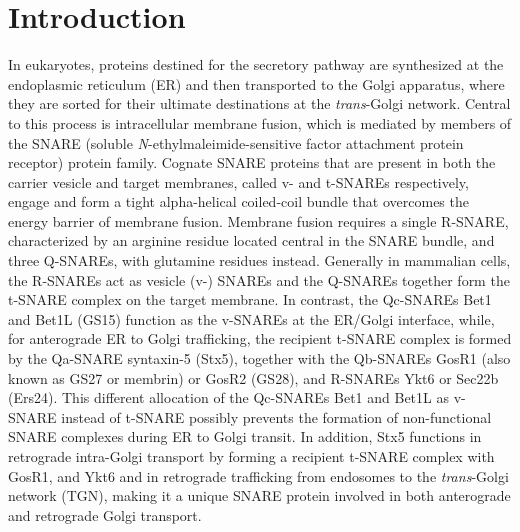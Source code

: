 \section{Introduction}

In eukaryotes, proteins destined for the secretory pathway are synthesized at the endoplasmic reticulum (ER) and then transported to the Golgi apparatus, where they are sorted for their ultimate destinations at the \emph{trans}-Golgi network. Central to this process is intracellular membrane fusion, which is mediated by members of the SNARE (soluble \emph{N}-ethylmaleimide-sensitive factor attachment protein receptor) protein family. Cognate SNARE proteins that are present in both the carrier vesicle and target membranes, called v- and t-SNAREs respectively, engage and form a tight alpha-helical coiled-coil bundle that overcomes the energy barrier of membrane fusion. Membrane fusion requires a single R-SNARE, characterized by an arginine residue located central in the SNARE bundle, and three Q-SNAREs, with glutamine residues instead. Generally in mammalian cells, the R-SNAREs act as vesicle (v-) SNAREs and the Q-SNAREs together form the t-SNARE complex on the target membrane\cite{jahn_snares_2006}. In contrast, the Qc-SNAREs Bet1 and Bet1L (GS15) function as the v-SNAREs at the ER/Golgi interface\cite{banfield_snare-like_1995,parlati_topological_2000,parlati_distinct_2002,xu_gs15_2002}, while, for anterograde ER to Golgi trafficking, the recipient t-SNARE complex is formed by the Qa-SNARE syntaxin-5 (Stx5)\cite{bentley_snare_2006,dascher_syntaxin_1994,rowe_role_1998,xu_subunit_2000}, together with the Qb-SNAREs GosR1 (also known as GS27 or membrin) or GosR2 (GS28), and R-SNAREs Ykt6 or Sec22b (Ers24)\cite{hay_localization_1998,paek_ers-24_1997,zhang_ykt6_2001}. This different allocation of the Qc-SNAREs Bet1 and Bet1L as v-SNARE instead of t-SNARE possibly prevents the formation of non-functional SNARE complexes during ER to Golgi transit. In addition, Stx5 functions in retrograde intra-Golgi transport by forming a recipient t-SNARE complex with GosR1, and Ykt6\cite{xu_gs15_2002,linders_stx5-mediated_2019} and in retrograde trafficking from endosomes to the \emph{trans}-Golgi network (TGN)\cite{malsam_organization_2011,tai_participation_2004}, making it a unique SNARE protein involved in both anterograde and retrograde Golgi transport.

